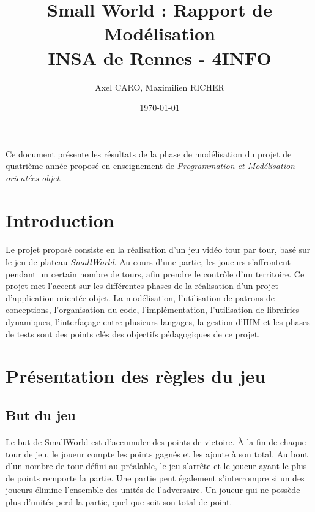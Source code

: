 \documentclass[a4paper]{article}
\title{Small World : Rapport de Modélisation \\ INSA de Rennes - 4INFO}
\author{Axel CARO, Maximilien RICHER}
\date{\today}
\begin{document}
\maketitle

\paragraph{}
Ce document présente les résultats de la phase de modélisation du projet de quatrième année proposé en enseignement de \textit{Programmation et Modélisation orientées objet}.
\\
\tableofcontents

\newpage

\section*{Introduction}
\paragraph{}
Le projet proposé consiste en la réalisation d'un jeu vidéo tour par tour, basé sur le jeu de plateau \textit{SmallWorld}. Au cours d'une partie, les joueurs s'affrontent pendant un certain nombre de tours, afin prendre le contrôle d'un territoire. Ce projet met l'accent sur les différentes phases de la réalisation d'un projet d'application orientée objet. La modélisation, l'utilisation de patrons de conceptions, l'organisation du code, l'implémentation, l'utilisation de librairies dynamiques, l'interfaçage entre plusieurs langages, la gestion d'IHM et les phases de tests sont des points clés des objectifs pédagogiques de ce projet.

\section{Présentation des règles du jeu}

\subsection{But du jeu}
\paragraph{}
Le but de SmallWorld est d'accumuler des points de victoire.
À la fin de chaque tour de jeu, le joueur compte les points gagnés et les ajoute à son total. Au bout d'un nombre de tour défini au préalable, le jeu s'arrête et le joueur ayant le plus de points remporte la partie. Une partie peut également s'interrompre si un des joueurs élimine l'ensemble des unités de l'adversaire. Un joueur qui ne possède plus d'unités perd la partie, quel que soit son total de point.
\end{document}
